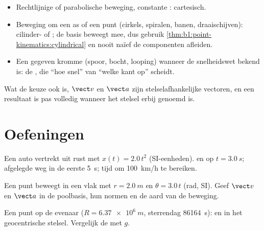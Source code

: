 \begin{method}\label{met:b1:point-kinematics:choose}
\begin{itemize}
  \item Rechtlijnige of parabolische beweging, constante :
        cartesisch.
  \item Beweging om een as of een punt (cirkels, spiralen, banen,
        draaischijven): cilinder- of ; de basis beweegt mee, dus gebruik
        \cref{thm:b1:point-kinematics:cylindrical} en nooit naïef
        de componenten afleiden.
  \item Een gegeven kromme (spoor, bocht, looping) wanneer de snelheidswet bekend is:
        de , die ``hoe snel'' van ``welke kant op'' scheidt.
\end{itemize}
Wat de keuze ook is, $\vect v$ en $\vect a$ zijn stelselafhankelijke
vectoren, en een resultaat is pas volledig wanneer het stelsel erbij genoemd is.
\end{method}

\section{Oefeningen}

\begin{exercise}[$\star$]\label{exo:b1:point-kinematics:1}
Een auto vertrekt uit rust met $x(t) = 2.0\,t^2$ (SI-eenheden).  en
 op $t = \qty{3.0}{s}$; afgelegde weg in de eerste
\qty{5}{s}; tijd om \qty{100}{km/h} te bereiken.
\end{exercise}

\begin{exercise}[$\star$]\label{exo:b1:point-kinematics:2}
Een punt beweegt in een vlak met $r = \qty{2.0}{m}$ en $\theta = 3.0\,t$
(rad, SI). Geef $\vect v$ en $\vect a$ in de poolbasis, hun normen
en de aard van de beweging.
\end{exercise}

\begin{exercise}[$\star$]\label{exo:b1:point-kinematics:3}
Een punt op de evenaar ($R = \qty{6.37e6}{m}$, sterrendag
\qty{86164}{s}):  en  in het geocentrische stelsel.
Vergelijk de  met $g$.
\end{exercise}

